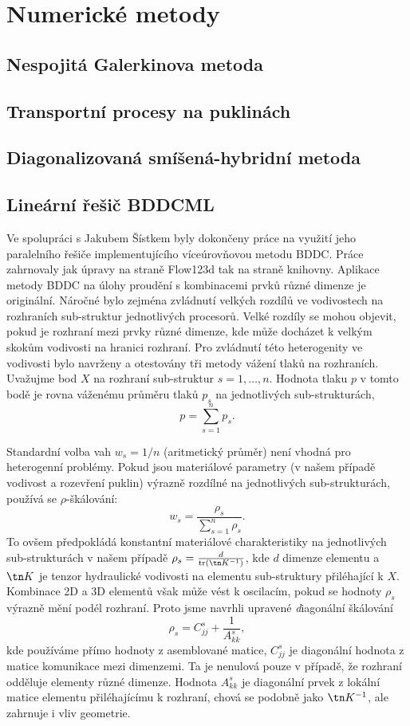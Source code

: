 \documentclass[11pt]{report}
\begin{document}
\section{Numerické metody}
\subsection{Nespojitá Galerkinova metoda}


\subsection{Transportní procesy na puklinách}
\label{sc:ad_on_fractures}


\subsection{Diagonalizovaná smíšená-hybridní metoda}


\subsection{Lineární řešič BDDCML}
Ve spolupráci s Jakubem Šístkem byly dokončeny práce na využití jeho 
paralelního řešiče implementujícího víceúrovňovou metodu BDDC. Práce zahrnovaly 
jak úpravy na straně Flow123d tak na straně knihovny. Aplikace metody BDDC na 
úlohy proudění s kombinacemi prvků různé dimenze je originální. Náročné bylo 
zejména zvládnutí velkých rozdílů ve vodivostech na rozhraních sub-struktur 
jednotlivých procesorů. Velké rozdíly se mohou objevit, pokud je rozhraní mezi 
prvky různé dimenze, kde může docházet k velkým skokům vodivosti na hranici 
rozhraní. Pro zvládnutí této heterogenity ve vodivosti bylo navrženy a 
otestovány tři metody vážení tlaků na rozhraních. Uvažujme bod $X$ na rozhraní 
sub-struktur $s=1,\dots,n$. Hodnota tlaku $p$ v tomto bodě je rovna váženému 
průměru tlaků $p_s$ na jednotlivých sub-strukturách, 
\[
    p = \sum_{s=1}^n p_s. 
\]

Standardní volba vah $w_s=1/n$ (aritmetický průměr) není vhodná pro heterogenní 
problémy. Pokud jsou materiálové parametry (v našem případě vodivost a 
rozevření puklin) výrazně rozdílné na jednotlivých sub-strukturách, používá se 
$\rho$-škálování:
\[
    w_s=\frac{\rho_s}{\sum_{s=1}^n \rho_s}.
\]
To ovšem předpokládá konstantní materiálové charakteristiky na jednotlivých 
sub-strukturách v našem případě $\rho_s=\frac{d}{\text{tr}(\tn K^{-1})}$, 
kde $d$ dimenze elementu a $\tn K$ je tenzor 
hydraulické vodivosti na elementu sub-struktury přiléhající k $X$. Kombinace 2D 
a 3D elementů však může vést k oscilacím, pokud se 
hodnoty $\rho_s$ výrazně mění podél rozhraní. Proto jsme navrhli upravené 
{\emph diagonální škálování}
\[
    \rho_s=C^s_{jj} + \frac{1}{A^s_{kk}},
\]
kde používáme přímo hodnoty z 
asemblované matice, $C^s_{jj}$ je diagonální hodnota z matice komunikace mezi 
dimenzemi. Ta je nenulová pouze v případě, že rozhraní odděluje elementy různé 
dimenze. Hodnota $A^s_{kk}$ je diagonální prvek z lokální matice elementu 
přiléhajícímu k rozhraní, chová se podobně jako $\tn K^{-1}$, ale zahrnuje i 
vliv geometrie. 
\end{document}
